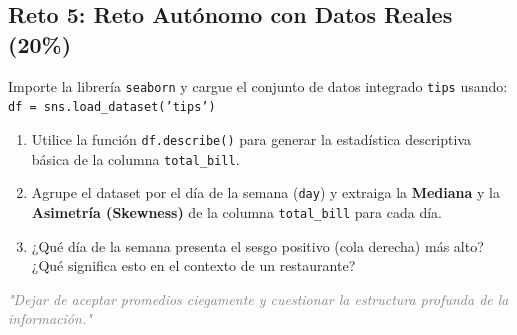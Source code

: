 \documentclass[12pt,a4paper]{article}
\begin{document}
\subsection*{Reto 5: Reto Autónomo con Datos Reales (20\%)}
Importe la librería \texttt{seaborn} y cargue el conjunto de datos integrado \texttt{tips} usando: \\ \texttt{df = sns.load\_dataset('tips')}
\begin{enumerate}
    \item Utilice la función \texttt{df.describe()} para generar la estadística descriptiva básica de la columna \texttt{total\_bill}.
    \item Agrupe el dataset por el día de la semana (\texttt{day}) y extraiga la \textbf{Mediana} y la \textbf{Asimetría (Skewness)} de la columna \texttt{total\_bill} para cada día.
    \item ¿Qué día de la semana presenta el sesgo positivo (cola derecha) más alto? ¿Qué significa esto en el contexto de un restaurante?
\end{enumerate}

\vspace{1cm}
\begin{center}
    \textit{\textcolor{gray}{"Dejar de aceptar promedios ciegamente y cuestionar la estructura profunda de la información."}}
\end{center}
\end{document}
